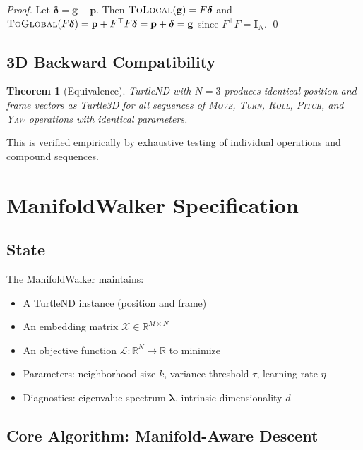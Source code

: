 \documentclass[11pt,letterpaper]{article}
\newtheorem{theorem}{Theorem}[section]
\newcommand{\R}{\mathbb{R}}
\newcommand{\pos}{\mathbf{p}}
\newcommand{\obj}{\mathcal{L}}
\newcommand{\eye}{\mathbf{I}}
\begin{document}
\begin{proof}
Let $\bm{\delta} = \mathbf{g} - \pos$. Then $\textsc{ToLocal}(\mathbf{g}) = F\bm{\delta}$
and $\textsc{ToGlobal}(F\bm{\delta}) = \pos + F^\top F \bm{\delta} = \pos + \bm{\delta} = \mathbf{g}$
since $F^\top F = \eye_N$. \qed
\end{proof}

\subsection{3D Backward Compatibility}

\begin{theorem}[Equivalence]
\label{thm:compat}
TurtleND with $N=3$ produces identical position and frame vectors as
Turtle3D for all sequences of \textsc{Move}, \textsc{Turn}, \textsc{Roll},
\textsc{Pitch}, and \textsc{Yaw} operations with identical parameters.
\end{theorem}

This is verified empirically by exhaustive testing of individual operations
and compound sequences.

\section{ManifoldWalker Specification}
\label{sec:walker}

\subsection{State}

The ManifoldWalker maintains:
\begin{itemize}[nosep]
  \item A TurtleND instance (position and frame)
  \item An embedding matrix $\mathcal{X} \in \R^{M \times N}$
  \item An objective function $\obj : \R^N \to \R$ to minimize
  \item Parameters: neighborhood size $k$, variance threshold $\tau$, learning rate $\eta$
  \item Diagnostics: eigenvalue spectrum $\bm{\lambda}$, intrinsic dimensionality $d$
\end{itemize}

\subsection{Core Algorithm: Manifold-Aware Descent}
\end{document}
